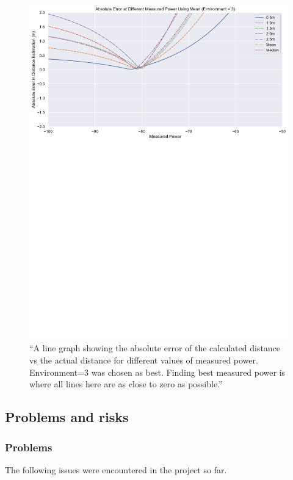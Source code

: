 \documentclass[11pt]{article}
\begin{document}
\begin{figure}[!ht]
    \centering
    \includegraphics[width=0.85\linewidth]{../images/pdf/rssi_experiment_graph.pdf}
    
    \caption{
      ``A line graph showing the absolute error of the calculated distance vs the 
      actual distance for different values of measured power. Environment=3 was 
      chosen as best. Finding best measured power is where all lines here are 
      as close to zero as possible.''
    }
    
    \label{fig:rssi_experiment_graph}
\end{figure}

\subsection{Problems and risks}\label{problems-and-risks}

\subsubsection{Problems}\label{problems}

The following issues were encountered in the project so far.
\end{document}
